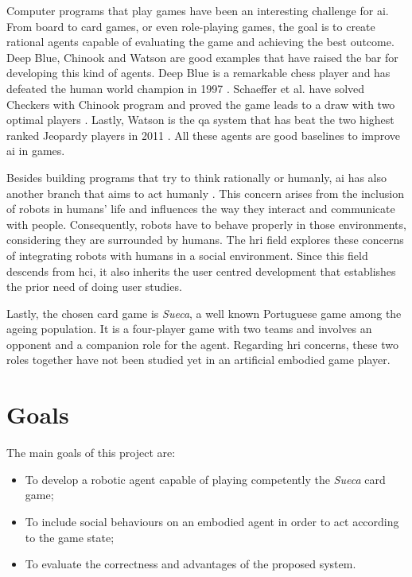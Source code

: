 Computer programs that play games have been an interesting challenge for \ac{ai}.
From board to card games, or even role-playing games, the goal is to create rational agents capable of evaluating the game and achieving the best outcome.
Deep Blue, Chinook and Watson are good examples that have raised the bar for developing this kind of agents.
Deep Blue is a remarkable chess player and has defeated the human world champion in 1997 \cite{Campbell2002}.
Schaeffer et al. have solved Checkers with Chinook program and proved the game leads to a draw with two optimal players \cite{Schaeffer1996}.
Lastly, Watson is the \ac{qa} system that has beat the two highest ranked Jeopardy players in 2011 \cite{Ferrucci2010}.
All these agents are good baselines to improve \ac{ai} in games.


Besides building programs that try to think rationally or humanly, \ac{ai} has also another branch that aims to act humanly \cite{Russell2009}.
This concern arises from the inclusion of robots in humans' life and influences the way they interact and communicate with people.
Consequently, robots have to behave properly in those environments, considering they are surrounded by humans.
The \ac{hri} field explores these concerns of integrating robots with humans in a social environment.
Since this field descends from \ac{hci}, it also inherits the user centred development that establishes the prior need of doing user studies.





Lastly, the chosen card game is \emph{Sueca}, a well known Portuguese game among the ageing population.
It is a four-player game with two teams and involves an opponent and a companion role for the agent.
Regarding \ac{hri} concerns, these two roles together have not been studied yet in an artificial embodied game player.



\section{Goals}
\label{sec:goals}

The main goals of this project are:
\begin{itemize}
\item To develop a robotic agent capable of playing competently the \emph{Sueca} card game;
\item To include social behaviours on an embodied agent in order to act according to the game state;
\item To evaluate the correctness and advantages of the proposed system.
\end{itemize}

